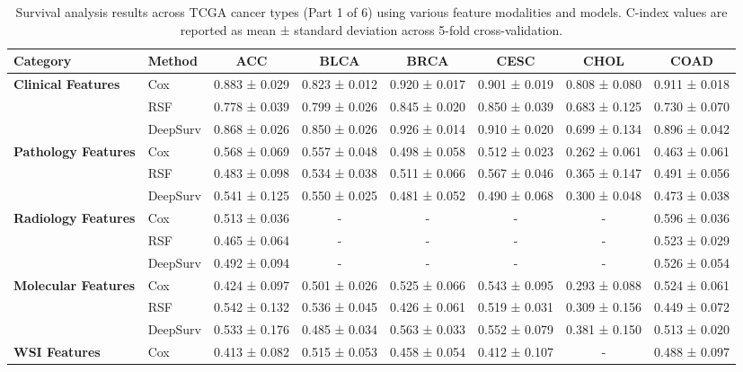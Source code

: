 \begin{sidewaystable}[htbp]
    \centering
    \caption{Survival analysis results across TCGA cancer types (Part 1 of 6) using various feature modalities and models. C-index values are reported as mean ± standard deviation across 5-fold cross-validation.}
    \label{tab:survival_results_1}
    \begin{tabular}{@{}llcccccc@{}}
        \toprule
        \textbf{Category} & \textbf{Method} & \textbf{ACC} & \textbf{BLCA} & \textbf{BRCA} & \textbf{CESC} & \textbf{CHOL} & \textbf{COAD} \\
        \midrule
        \multirow{3}{*}{\textbf{Clinical Features}} & Cox & 0.883 ± 0.029 & 0.823 ± 0.012 & 0.920 ± 0.017 & 0.901 ± 0.019 & 0.808 ± 0.080 & 0.911 ± 0.018 \\
        & RSF & 0.778 ± 0.039 & 0.799 ± 0.026 & 0.845 ± 0.020 & 0.850 ± 0.039 & 0.683 ± 0.125 & 0.730 ± 0.070 \\
        & DeepSurv & 0.868 ± 0.026 & 0.850 ± 0.026 & 0.926 ± 0.014 & 0.910 ± 0.020 & 0.699 ± 0.134 & 0.896 ± 0.042 \\
        \midrule
        \multirow{3}{*}{\textbf{Pathology Features}} & Cox & 0.568 ± 0.069 & 0.557 ± 0.048 & 0.498 ± 0.058 & 0.512 ± 0.023 & 0.262 ± 0.061 & 0.463 ± 0.061 \\
        & RSF & 0.483 ± 0.098 & 0.534 ± 0.038 & 0.511 ± 0.066 & 0.567 ± 0.046 & 0.365 ± 0.147 & 0.491 ± 0.056 \\
        & DeepSurv & 0.541 ± 0.125 & 0.550 ± 0.025 & 0.481 ± 0.052 & 0.490 ± 0.068 & 0.300 ± 0.048 & 0.473 ± 0.038 \\
        \midrule
        \multirow{3}{*}{\textbf{Radiology Features}} & Cox & 0.513 ± 0.036 & - & - & - & - & 0.596 ± 0.036 \\
        & RSF & 0.465 ± 0.064 & - & - & - & - & 0.523 ± 0.029 \\
        & DeepSurv & 0.492 ± 0.094 & - & - & - & - & 0.526 ± 0.054 \\
        \midrule
        \multirow{3}{*}{\textbf{Molecular Features}} & Cox & 0.424 ± 0.097 & 0.501 ± 0.026 & 0.525 ± 0.066 & 0.543 ± 0.095 & 0.293 ± 0.088 & 0.524 ± 0.061 \\
        & RSF & 0.542 ± 0.132 & 0.536 ± 0.045 & 0.426 ± 0.061 & 0.519 ± 0.031 & 0.309 ± 0.156 & 0.449 ± 0.072 \\
        & DeepSurv & 0.533 ± 0.176 & 0.485 ± 0.034 & 0.563 ± 0.033 & 0.552 ± 0.079 & 0.381 ± 0.150 & 0.513 ± 0.020 \\
        \midrule
        \multirow{3}{*}{\textbf{WSI Features}} & Cox & 0.413 ± 0.082 & 0.515 ± 0.053 & 0.458 ± 0.054 & 0.412 ± 0.107 & - & 0.488 ± 0.097 \\

\end{tabular}
\end{sidewaystable}
